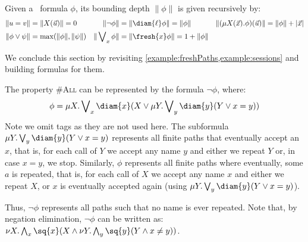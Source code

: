 \begin{definition}
	Given a \fhml\ formula $\phi$, its bounding depth $\|\phi\|$ is given recursively by:	
	\begin{align*}
		\|u = v\| &= \|X(\vec u)\| = 0  &\|\lnot \phi\| &= \|\diam{\ell}\phi\| = \|\phi\| &\|(\mu X(\vec x).\phi)(\vec u)\| = \|\phi\| + |\vec x|\\
		\|\phi \lor \psi\| &= \max(\|\phi\|, \|\psi\|) & \|\bigvee\nolimits_x \phi\| &= \|\fresh{x} \phi\| = 1 + \|\phi\|   
	\end{align*}
\end{definition}


We conclude this section by revisiting \cref{example:freshPaths,example:sessions} and building formulas for them.

\begin{example} The property \textsc{\#All}
 can be represented by the formula $\lnot \phi$, where:
\[
	\phi = \mu X.\bigvee\nolimits_x\diam{x}(X\lor\mu Y.\bigvee\nolimits_y \diam{y}(Y\lor x=y))
\]
Note we omit tags as they are not used here.
The subformula $\mu Y.\bigvee\nolimits_y \diam{y}(Y\lor x=y)$ represents all finite paths that eventually accept an $x$, that is, for each call of $Y$ we accept any name $y$ and either  we repeat $Y$ or, in case $x = y$, we stop. 
%
Similarly, $\phi$ represents all finite paths where eventually, some $a$ is repeated, that is, for each call of $X$ we accept any name $x$ and either we 
repeat $X$, or $x$ is eventually accepted again (using $\mu Y.\bigvee\nolimits_y \diam{y}(Y\lor x=y)$).

Thus, $\lnot \phi$ represents all paths such that no name is ever repeated.
Note that, by negation elimination, $\lnot \phi$ can be written as:
$
\nu X.\bigwedge\nolimits_x\sq{x}( X\land \nu Y.\bigwedge\nolimits_y \sq{y}(Y\land x\neq y))
$.
\end{example}

